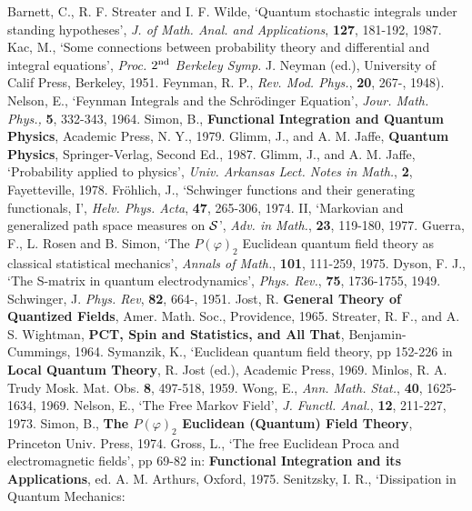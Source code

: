  Barnett, C., R. F. Streater and I. F. Wilde, `Quantum
stochastic integrals under standing hypotheses', {\em J. of Math.
Anal. and Applications}, {\bf 127}, 181-192, 1987.
 Kac, M., `Some connections between probability theory
and differential and integral equations', {\em Proc. $2^{\rm nd}$ Berkeley
Symp.} J. Neyman (ed.), University of Calif Press, Berkeley, 1951.
 Feynman, R. P., {\em Rev. Mod. Phys.}, {\bf 20}, 267-,
1948).
 Nelson, E., `Feynman Integrals and the
Schr\"{o}dinger Equation', {\em Jour. Math. Phys.,} {\bf 5}, 332-343, 1964.
 Simon, B., {\bf Functional Integration and Quantum
Physics}, Academic Press, N. Y., 1979.
 Glimm, J., and A. M. Jaffe, {\bf Quantum Physics},
Springer-Verlag, Second Ed., 1987.
 Glimm, J., and A. M. Jaffe, `Probability applied to
physics', {\em Univ. Arkansas Lect. Notes in Math.}, {\bf 2},
Fayetteville, 1978.
 Fr\"{o}hlich, J., `Schwinger functions and their
generating functionals, I', {\em Helv. Phys. Acta}, {\bf 47}, 265-306, 1974.
II, `Markovian and generalized path space measures on ${\cal S}$',
{\em Adv. in Math.}, {\bf 23}, 119-180, 1977.
 Guerra, F., L. Rosen and B. Simon, `The $P(\varphi)_2$
Euclidean quantum field theory as classical statistical mechanics',
{\em Annals of Math.}, {\bf 101}, 111-259, 1975.
 Dyson, F. J., `The S-matrix in quantum electrodynamics',
{\em Phys. Rev.}, {\bf 75}, 1736-1755, 1949.
 Schwinger, J. {\em Phys. Rev}, {\bf 82}, 664-, 1951.
 Jost, R. {\bf General Theory of Quantized Fields}, Amer.
Math. Soc., Providence, 1965.
 Streater, R. F., and A. S. Wightman, {\bf PCT, Spin and Statistics,
and All That}, Benjamin-Cummings, 1964.
 Symanzik, K., `Euclidean quantum field theory, pp 152-226
in {\bf Local Quantum Theory}, R. Jost (ed.), Academic Press, 1969.
 Minlos, R. A. Trudy Mosk. Mat. Obs. {\bf 8}, 497-518, 1959.
 Wong, E., {\em Ann. Math. Stat.}, {\bf 40}, 1625-1634, 1969.
 Nelson, E., `The Free Markov Field', {\em J. Functl.
Anal.}, {\bf 12}, 211-227, 1973.
 Simon, B., {\bf The $P(\varphi)_2$ Euclidean (Quantum)
Field Theory}, Princeton Univ. Press, 1974.
 Gross, L., `The free Euclidean Proca and electromagnetic
fields', pp 69-82 in: {\bf Functional Integration and its
Applications}, ed. A. M. Arthurs, Oxford, 1975.
 Senitzsky, I. R., `Dissipation in Quantum Mechanics:
